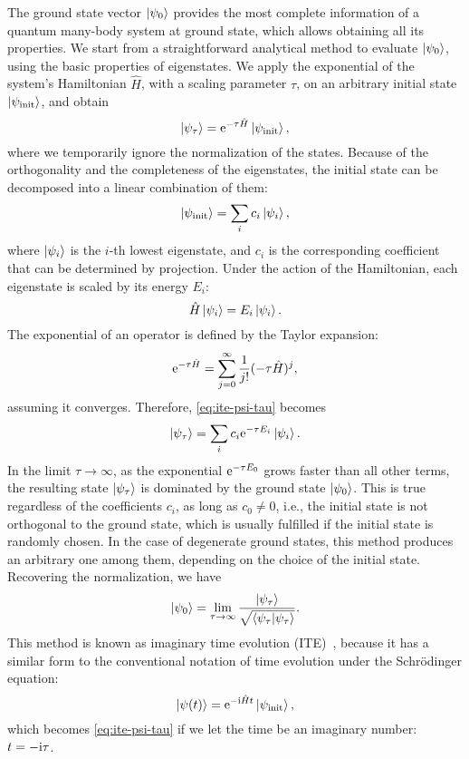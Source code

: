 The ground state vector $\ket{\psi_0}$ provides the most complete information of a quantum many-body system at ground state, which allows obtaining all its properties. We start from a straightforward analytical method to evaluate $\ket{\psi_0}$, using the basic properties of eigenstates. We apply the exponential of the system's Hamiltonian $\hat{H}$, with a scaling parameter $\tau$, on an arbitrary initial state $\ket{\psi_\text{init}}$, and obtain
\begin{equation}
\ket{\psi_\tau} = \mathrm{e}^{-\tau \hat{H}} \ket{\psi_\text{init}},
\label{eq:ite-psi-tau}
\end{equation}
where we temporarily ignore the normalization of the states. Because of the orthogonality and the completeness of the eigenstates, the initial state can be decomposed into a linear combination of them:
\begin{equation}
\ket{\psi_\text{init}} = \sum_i c_i \ket{\psi_i},
\end{equation}
where $\ket{\psi_i}$ is the $i$-th lowest eigenstate, and $c_i$ is the corresponding coefficient that can be determined by projection. Under the action of the Hamiltonian, each eigenstate is scaled by its energy $E_i$:
\begin{equation}
\hat{H} \ket{\psi_i} = E_i \ket{\psi_i}.
\end{equation}
The exponential of an operator is defined by the Taylor expansion:
\begin{equation}
\mathrm{e}^{-\tau \hat{H}} = \sum_{j = 0}^\infty \frac{1}{j!} (-\tau \hat{H})^j,
\label{eq:ite-taylor}
\end{equation}
assuming it converges. Therefore, \cref{eq:ite-psi-tau} becomes
\begin{equation}
\ket{\psi_\tau} = \sum_i c_i \mathrm{e}^{-\tau E_i} \ket{\psi_i}.
\end{equation}
In the limit $\tau \to \infty$, as the exponential $\mathrm{e}^{-\tau E_0}$ grows faster than all other terms, the resulting state $\ket{\psi_\tau}$ is dominated by the ground state $\ket{\psi_0}$. This is true regardless of the coefficients $c_i$, as long as $c_0 \neq 0$, i.e., the initial state is not orthogonal to the ground state, which is usually fulfilled if the initial state is randomly chosen. In the case of degenerate ground states, this method produces an arbitrary one among them, depending on the choice of the initial state. Recovering the normalization, we have
\begin{equation}
\ket{\psi_0} = \lim_{\tau \to \infty} \frac{\ket{\psi_\tau}}{\sqrt{\ip{\psi_\tau}}}.
\end{equation}
This method is known as imaginary time evolution (ITE)~\cite{goldberg1967integration}, because it has a similar form to the conventional notation of time evolution under the Schrödinger equation:
\begin{equation}
\ket{\psi(t)} = \mathrm{e}^{-\mathrm{i} \hat{H} t} \ket{\psi_\text{init}},
\end{equation}
which becomes \cref{eq:ite-psi-tau} if we let the time be an imaginary number: $t = -\mathrm{i} \tau$.

